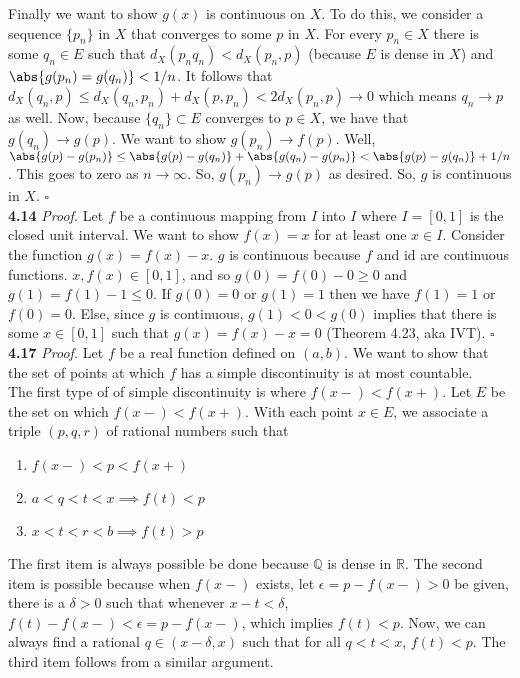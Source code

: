 \documentclass[11pt]{article}
\begin{document}
Finally we want to show $g(x)$ is continuous on $X$. To do this, we consider a sequence $\{ p_n\}$ in $X$ that converges to some $p$ in $X$. For every $p_n \in X$ there is some $q_n \in E$ such that $d_X(p_n q_n) < d_X(p_n,p)$ (because $E$ is dense in $X$) and $\abs{g(p_n) = g(q_n)} < 1/n$. It follows that $d_X(q_n,p) \leq d_X(q_n,p_n) + d_X(p,p_n) < 2d_X(p_n,p) \to 0$ which means $q_n \to p$ as well. Now, because $\{ q_n\} \subset E$ converges to $p \in X$, we have that $g(q_n) \to g(p)$. We want to show $g(p_n) \to f(p)$. Well, $\abs{g(p) - g(p_n)} \leq \abs{g(p)-g(q_n)} + \abs{g(q_n) - g(p_n)} < \abs{g(p)-g(q_n)} + 1/n$. This goes to zero as $n\to\infty$. So, $g(p_n) \to g(p)$ as desired. So, $g$ is continuous  in $X$.  \hfill $\square$\\




\noindent \textbf{4.14} 
\noindent \textit{Proof.} Let $f$ be a continuous mapping from $I$ into $I$ where $I = [0,1]$ is the closed unit interval. We want to show $f(x) = x$ for at least one $x\in I$. Consider the function $g(x) = f(x) -x$. $g$ is continuous because $f$ and $\text{id}$ are continuous functions. $x, f(x) \in [0,1]$, and so $g(0) = f(0) - 0 \geq 0$ and  $g(1) = f(1) - 1 \leq 0$. If $g(0) = 0$ or $g(1) = 1$ then we have $f(1)= 1$ or $f(0) = 0$. Else, since $g$ is continuous, $g(1) < 0 < g(0)$ implies that there is some $x \in [0,1]$ such that $g(x) = f(x) -x = 0$ (Theorem 4.23, aka IVT). \hfill $\square$\\

\noindent \textbf{4.17}
\noindent \textit{Proof.} Let $f$ be a real function defined on $(a,b)$. We want to show that the set of points at which $f$ has a simple discontinuity is at most countable. \\



The first type of of simple discontinuity is where $f(x-) < f(x+)$. Let $E$ be the set on which $f(x-) < f(x+)$. With each point $x\in E$, we associate a triple $(p,q,r)$ of rational numbers such that
\begin{enumerate}
	\item $f(x-) < p < f(x+)$
	\item $a < q < t < x \implies f(t) < p$
	\item $x < t < r < b \implies f(t) > p$
\end{enumerate}
The first item is always possible be done because $\mathbb{Q}$ is dense in $\mathbb{R}$. The second item is possible because when $f(x-)$ exists, let $\epsilon  = p - f(x-)> 0$ be given, there is a $\delta > 0$ such that whenever $x - t < \delta$, $f(t) - f(x-) < \epsilon = p - f(x-)$, which implies $f(t) < p$. Now, we can always find a rational $q \in (x - \delta,x)$ such that for all $q < t < x$, $f(t) < p$. The third item follows from a similar argument. \\
\end{document}
